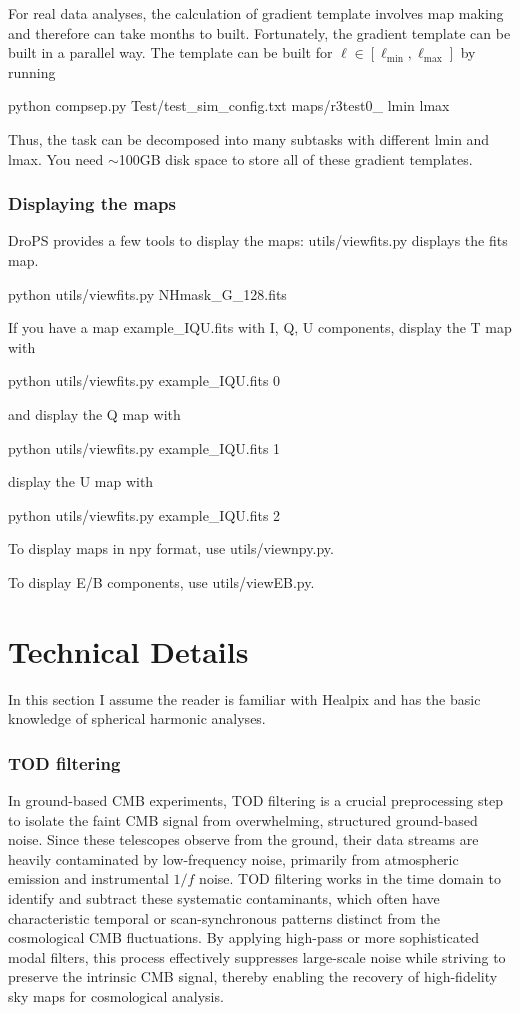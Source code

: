 \documentclass[12pt, a4paper]{ctexart} %
\def\tbox#1{\begin{tcolorbox}#1\end{tcolorbox}}
\begin{document}
For real data analyses, the calculation of gradient template involves map making and therefore can take months to built. Fortunately, the gradient template can be built in a parallel way. The template can be built for $\ell \in [\ell_{\min}, \ell_{\max}]$ by running
\tbox{python compsep.py Test/test\_sim\_config.txt maps/r3test0\_ lmin lmax}
Thus, the task can be decomposed into many subtasks with different lmin and lmax. You need $\sim$100GB disk space to store all of these gradient templates.



\subsubsection{Displaying the maps}

DroPS provides a few tools to display the maps: utils/viewfits.py displays the fits map.

\tbox{python utils/viewfits.py NHmask\_G\_128.fits}

If you have a map example\_IQU.fits with I, Q, U components, display the T map with
\tbox{python utils/viewfits.py example\_IQU.fits 0}
and display the Q map with
\tbox{python utils/viewfits.py example\_IQU.fits 1}
display the U map with
\tbox{python utils/viewfits.py example\_IQU.fits 2}


To display maps in npy format, use utils/viewnpy.py.

To display E/B components, use utils/viewEB.py.

\section{Technical Details}

In this section I assume the reader is familiar with Healpix and has the basic knowledge of spherical harmonic analyses.

\subsubsection{TOD filtering}

In ground-based CMB experiments, TOD filtering is a crucial preprocessing step to isolate the faint CMB signal from overwhelming, structured ground-based noise. Since these telescopes observe from the ground, their data streams are heavily contaminated by low-frequency noise, primarily from atmospheric emission and instrumental $1/f$ noise. TOD filtering works in the time domain to identify and subtract these systematic contaminants, which often have characteristic temporal or scan-synchronous patterns distinct from the cosmological CMB fluctuations. By applying high-pass or more sophisticated modal filters, this process effectively suppresses large-scale noise while striving to preserve the intrinsic CMB signal, thereby enabling the recovery of high-fidelity sky maps for cosmological analysis.
\end{document}

